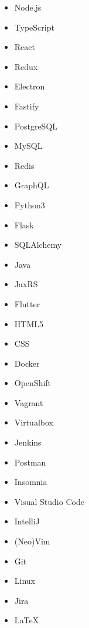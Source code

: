 

\begin{multicols}{5}
	\begin{itemize}
		\item Node.js
		\item TypeScript
		\item React
		\item Redux
		\item Electron
		\item Fastify
		\item PostgreSQL
		\item MySQL
		\item Redis
		\item GraphQL
		\item Python3
		\item Flask
		\item SQLAlchemy
		\item Java
		\item JaxRS
		\item Flutter
		\item HTML5
		\item CSS
		\item Docker
		\item OpenShift
		\item Vagrant
		\item Virtualbox
		\item Jenkins
		\item Postman
		\item Insomnia
		\item Visual Studio Code
		\item IntelliJ
		\item (Neo)Vim
		\item Git
		\item Linux
		\item Jira
		\item LaTeX
	\end{itemize}
\end{multicols}
